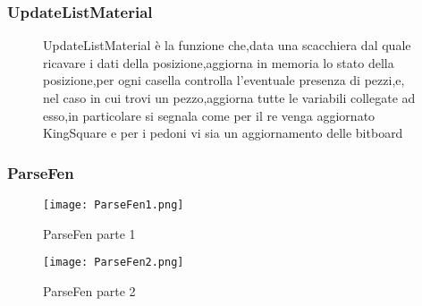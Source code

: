 \subsubsection{UpdateListMaterial}
\begin{figure}[H]
    \begin{minipage}[t]{.63\textwidth}
        \centering {}
    \end{minipage}
    \begin{minipage}[t]{0.35\textwidth}
        \small{UpdateListMaterial è la funzione che,data una scacchiera dal quale ricavare i dati della posizione,aggiorna in memoria lo stato della posizione,per ogni casella controlla l'eventuale presenza di pezzi,e,
            nel caso in cui trovi un pezzo,aggiorna tutte le variabili collegate ad esso,in particolare si segnala come per il re venga aggiornato KingSquare e per i pedoni vi sia un aggiornamento delle bitboard}
    \end{minipage}
\end{figure}


\subsubsection{ParseFen}


\begin{figure}[H]
    \centering
    \begin{minipage}[b]{0.4\textwidth}
        \texttt{[image: ParseFen1.png]}
        \caption{ParseFen parte 1}
    \end{minipage}
    \hfill
    \begin{minipage}[b]{0.4\textwidth}
        \texttt{[image: ParseFen2.png]}
        \caption{ParseFen parte 2}
    \end{minipage}
\end{figure}





